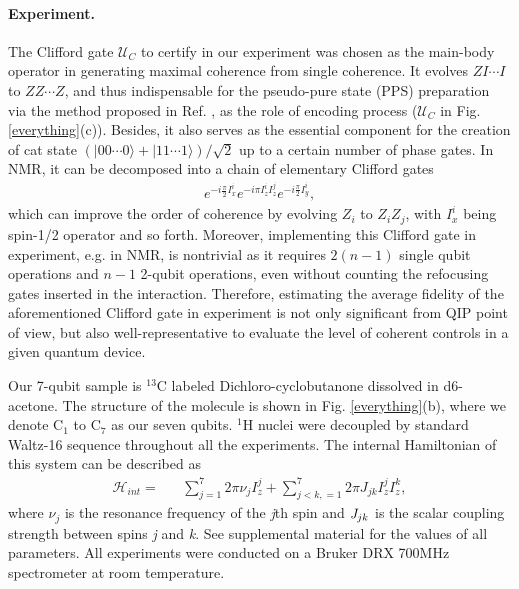 \documentclass[prl,twocolumn,showpacs]{revtex4-1}
\newcommand{\ket}[1]{|#1\rangle}
\begin{document}
\paragraph*{Experiment.}
The Clifford gate $\mathcal{U}_{C}$ to certify in our experiment was chosen as the main-body operator in generating maximal coherence from single coherence. It evolves $ZI\cdots I$ to $ZZ\cdots Z$, and thus indispensable for the pseudo-pure state (PPS) preparation via the method proposed in Ref. \cite{Knill2000}, as the role of encoding process ($\mathcal{U}_{C}$ in Fig. \ref{everything}(c)). Besides, it also serves as the essential component for the creation of cat state $\left( \ket{00\cdots 0}+\ket{11\cdots 1} \right)/\sqrt{2}$ up to a certain number of phase gates. In NMR, it can be decomposed into a chain of elementary Clifford gates
\begin{align} \label{decomp}
e^{-i\frac{\pi}{2}I_x^i}e^{-i\pi I_z^i I_z^j} e^{-i\frac{\pi}{2}I_y^i},
\end{align}
which can improve the order of coherence by evolving $Z_i$ to $Z_i Z_j$, with $I_x^i$ being spin-1/2 operator and so forth. Moreover, implementing this Clifford gate in experiment, e.g. in NMR, is nontrivial as it requires $2(n-1)$ single qubit operations and $n-1$ 2-qubit operations, even without counting the refocusing gates inserted in the interaction. Therefore, estimating the average fidelity of the aforementioned Clifford gate in experiment is not only significant from QIP point of view, but also well-representative to evaluate the level of coherent controls in a given quantum device.

Our 7-qubit sample is $^{13}$C labeled Dichloro-cyclobutanone dissolved in d6-acetone. The structure of the molecule is shown in Fig. \ref{everything}(b), where we denote C$_1$ to C$_7$ as our seven qubits. $^1$H nuclei were decoupled by standard Waltz-16 sequence throughout all the experiments. The internal Hamiltonian of this system can be described as 
\begin{align}\label{Hamiltonian}
\mathcal{H}_{int}=&&\sum\limits_{j=1}^7 {2\pi \nu _j } I_z^j  + \sum\limits_{j < k,=1}^7 {2\pi} J_{jk} I_z^j I_z^k,
\end{align}
where $\nu_j$ is the resonance frequency of the \emph{j}th spin and $\emph{J}_{jk}$ is the scalar coupling strength between spins \emph{j} and \emph{k}. See supplemental material for the values of all parameters. All experiments were conducted on a Bruker DRX 700MHz spectrometer at room temperature.
\end{document}

